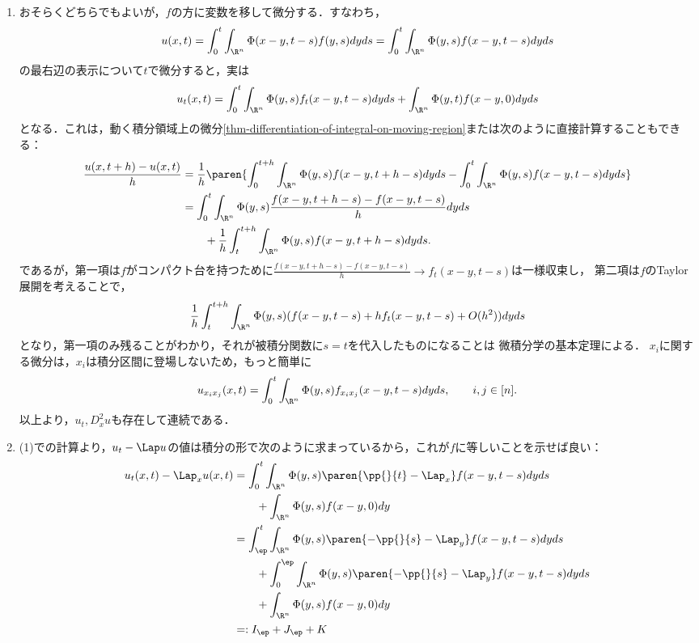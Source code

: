 \documentclass[uplatex,dvipdfmx]{jsreport}
\begin{document}
\begin{Proof}\mbox{}
    \begin{enumerate}
        \item おそらくどちらでもよいが，$f$の方に変数を移して微分する．すなわち，
        \[u(x,t)=\int^t_0\int_{\R^n}\Phi(x-y,t-s)f(y,s)dyds=\int^t_0\int_{\R^n}\Phi(y,s)f(x-y,t-s)dyds\]
        の最右辺の表示について$t$で微分すると，実は
        \[u_t(x,t)=\int^t_0\int_{\R^n}\Phi(y,s)f_t(x-y,t-s)dyds+\int_{\R^n}\Phi(y,t)f(x-y,0)dyds\]
        となる．これは，動く積分領域上の微分\ref{thm-differentiation-of-integral-on-moving-region}または次のように直接計算することもできる：
        \begin{align*}
            \frac{u(x,t+h)-u(x,t)}{h}&=\frac{1}{h}\paren{\int^{t+h}_0\int_{\R^n}\Phi(y,s)f(x-y,t+h-s)dyds-\int^t_0\int_{\R^n}\Phi(y,s)f(x-y,t-s)dyds}\\
            &=\int^t_0\int_{\R^n}\Phi(y,s)\frac{f(x-y,t+h-s)-f(x-y,t-s)}{h}dyds\\
            &\qquad+\frac{1}{h}\int^{t+h}_t\int_{\R^n}\Phi(y,s)f(x-y,t+h-s)dyds.
        \end{align*}
        であるが，第一項は$f$がコンパクト台を持つために$\frac{f(x-y,t+h-s)-f(x-y,t-s)}{h}\to f_t(x-y,t-s)$は一様収束し，
        第二項は$f$のTaylor展開を考えることで，
        \[\frac{1}{h}\int^{t+h}_t\int_{\R^n}\Phi(y,s)(f(x-y,t-s)+hf_t(x-y,t-s)+O(h^2))dyds\]
        となり，第一項のみ残ることがわかり，それが被積分関数に$s=t$を代入したものになることは
        微積分学の基本定理による．
        $x_i$に関する微分は，$x_i$は積分区間に登場しないため，もっと簡単に
        \[u_{x_ix_j}(x,t)=\int^t_0\int_{\R^n}\Phi(y,s)f_{x_ix_j}(x-y,t-s)dyds,\qquad i,j\in[n].\]
        以上より，$u_t,D_x^2u$も存在して連続である．
        \item (1)での計算より，$u_t-\Lap u$の値は積分の形で次のように求まっているから，これが$f$に等しいことを示せば良い：
        \begin{align*}
            u_t(x,t)-\Lap_xu(x,t)&=\int^t_0\int_{\R^n}\Phi(y,s)\paren{\pp{}{t}-\Lap_x}f(x-y,t-s)dyds\\
            &\qquad+\int_{\R^n}\Phi(y,s)f(x-y,0)dy\\
            &=\int^t_\ep\int_{\R^n}\Phi(y,s)\paren{-\pp{}{s}-\Lap_y}f(x-y,t-s)dyds\\
            &\qquad+\int^\ep_0\int_{\R^n}\Phi(y,s)\paren{-\pp{}{s}-\Lap_y}f(x-y,t-s)dyds\\
            &\qquad+\int_{\R^n}\Phi(y,s)f(x-y,0)dy\\
            &=:I_\ep+J_\ep+K

\end{align*}
\end{enumerate}
\end{Proof}
\end{document}
